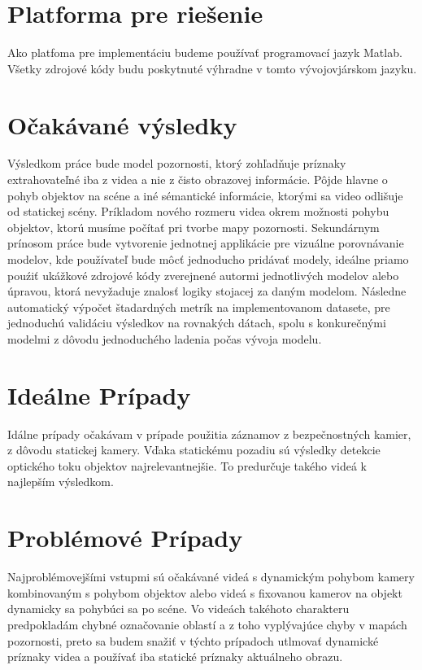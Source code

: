 \section{Platforma pre riešenie}
Ako platfoma pre implementáciu budeme používať programovací jazyk Matlab.
Všetky zdrojové kódy budu poskytnuté výhradne v tomto vývojovjárskom jazyku.
\section{Očakávané výsledky}
Výsledkom práce bude model pozornosti, ktorý zohľadňuje príznaky extrahovateľné iba z videa a nie z čisto obrazovej informácie.
Pôjde hlavne o pohyb objektov na scéne a iné sémantické informácie, ktorými sa video odlišuje od statickej scény.
Príkladom nového rozmeru videa okrem možnosti pohybu objektov, ktorú musíme počítať pri tvorbe mapy pozornosti.
Sekundárnym prínosom práce bude vytvorenie jednotnej applikácie pre vizuálne porovnávanie modelov, kde používateľ bude môcť jednoducho pridávať modely, ideálne priamo pouźiť ukážkové zdrojové kódy zverejnené autormi jednotlivých modelov alebo úpravou, ktorá nevyžaduje znalosť logiky stojacej za daným modelom.
Následne automatický výpočet štadardných metrík na implementovanom datasete, pre jednoduchú validáciu výsledkov na rovnakých dátach, spolu s konkurečnými modelmi z dôvodu jednoduchého ladenia počas vývoja modelu.
\section{Ideálne Prípady}
Idálne prípady očakávam v prípade použitia záznamov z bezpečnostných kamier, z dôvodu statickej kamery.
Vďaka statickému pozadiu sú výsledky detekcie optického toku objektov najrelevantnejšie.
To predurčuje takého videá k najlepším výsledkom.
\section{Problémové Prípady}
Najproblémovejšími vstupmi sú očakávané videá s dynamickým pohybom kamery kombinovaným s pohybom objektov alebo videá s fixovanou kamerov na objekt dynamicky sa pohybúci sa po scéne.
Vo videách takéhoto charakteru predpokladám chybné označovanie oblastí a z toho vyplývajúce chyby v mapách pozornosti, preto sa budem snažiť v týchto prípadoch utlmovať dynamické príznaky videa a používať iba statické príznaky aktuálneho obrazu.

